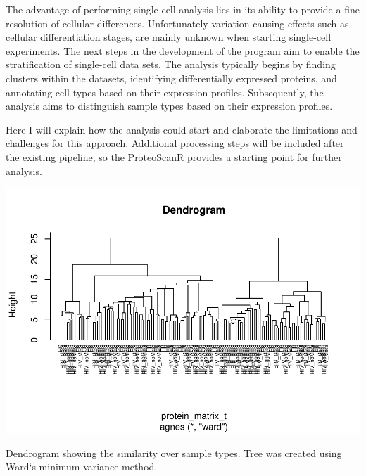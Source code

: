\documentclass[
  11pt,
]{article}
\let\origfigure\figure
\begin{document}
The advantage of performing single-cell analysis lies in its ability to provide a fine resolution of cellular differences. Unfortunately variation causing effects such as cellular differentiation stages, are mainly unknown when starting single-cell experiments.
The next steps in the development of the program aim to enable the stratification of single-cell data sets. The analysis typically begins by finding clusters within the datasets, identifying differentially expressed proteins, and annotating cell types based on their expression profiles. Subsequently, the analysis aims to distinguish sample types based on their expression profiles.

Here I will explain how the analysis could start and elaborate the limitations and challenges for this approach. Additional processing steps will be included after the existing pipeline, so the ProteoScanR provides a starting point for further analysis.

\bgroup  \origfigure[H] 

{\centering \includegraphics[width=1\linewidth]{Thesis_files/figure-latex/cluster-analysis-dendrogram-1} 

}

\caption{Dendrogram showing the similarity over sample types. Tree was created using Ward`s minimum variance method.}\label{fig:cluster-analysis-dendrogram}
 \endfigure\egroup
\end{document}
